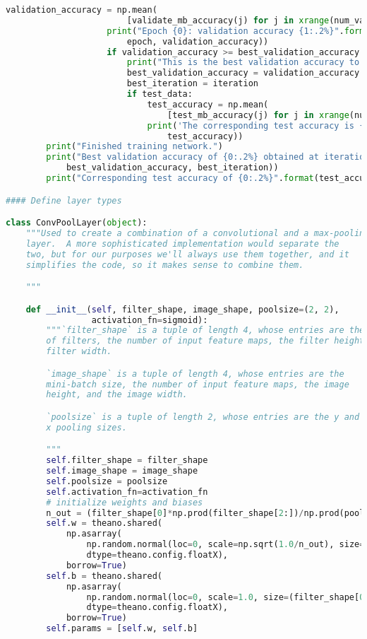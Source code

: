 \begin{lstlisting}[language=Python]
                    validation_accuracy = np.mean(
                        [validate_mb_accuracy(j) for j in xrange(num_validation_batches)])
                    print("Epoch {0}: validation accuracy {1:.2%}".format(
                        epoch, validation_accuracy))
                    if validation_accuracy >= best_validation_accuracy:
                        print("This is the best validation accuracy to date.")
                        best_validation_accuracy = validation_accuracy
                        best_iteration = iteration
                        if test_data:
                            test_accuracy = np.mean(
                                [test_mb_accuracy(j) for j in xrange(num_test_batches)])
                            print('The corresponding test accuracy is {0:.2%}'.format(
                                test_accuracy))
        print("Finished training network.")
        print("Best validation accuracy of {0:.2%} obtained at iteration {1}".format(
            best_validation_accuracy, best_iteration))
        print("Corresponding test accuracy of {0:.2%}".format(test_accuracy))

#### Define layer types

class ConvPoolLayer(object):
    """Used to create a combination of a convolutional and a max-pooling
    layer.  A more sophisticated implementation would separate the
    two, but for our purposes we'll always use them together, and it
    simplifies the code, so it makes sense to combine them.

    """

    def __init__(self, filter_shape, image_shape, poolsize=(2, 2),
                 activation_fn=sigmoid):
        """`filter_shape` is a tuple of length 4, whose entries are the number
        of filters, the number of input feature maps, the filter height, and the
        filter width.

        `image_shape` is a tuple of length 4, whose entries are the
        mini-batch size, the number of input feature maps, the image
        height, and the image width.

        `poolsize` is a tuple of length 2, whose entries are the y and
        x pooling sizes.

        """
        self.filter_shape = filter_shape
        self.image_shape = image_shape
        self.poolsize = poolsize
        self.activation_fn=activation_fn
        # initialize weights and biases
        n_out = (filter_shape[0]*np.prod(filter_shape[2:])/np.prod(poolsize))
        self.w = theano.shared(
            np.asarray(
                np.random.normal(loc=0, scale=np.sqrt(1.0/n_out), size=filter_shape),
                dtype=theano.config.floatX),
            borrow=True)
        self.b = theano.shared(
            np.asarray(
                np.random.normal(loc=0, scale=1.0, size=(filter_shape[0],)),
                dtype=theano.config.floatX),
            borrow=True)
        self.params = [self.w, self.b]


\end{lstlisting}
